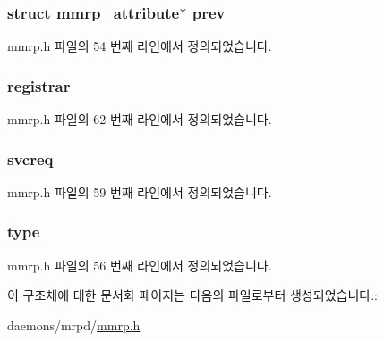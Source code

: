 \subsubsection[{\texorpdfstring{prev}{prev}}]{\setlength{\rightskip}{0pt plus 5cm}struct {\bf mmrp\+\_\+attribute}$\ast$ prev}\hypertarget{structmmrp__attribute_a7fbec6f5452666d1234cf6138dc9f0ba}{}\label{structmmrp__attribute_a7fbec6f5452666d1234cf6138dc9f0ba}


mmrp.\+h 파일의 54 번째 라인에서 정의되었습니다.

\subsubsection[{\texorpdfstring{registrar}{registrar}}]{ registrar}\hypertarget{structmmrp__attribute_a9e893db6ef01e9cda330159f5d3ee764}{}\label{structmmrp__attribute_a9e893db6ef01e9cda330159f5d3ee764}


mmrp.\+h 파일의 62 번째 라인에서 정의되었습니다.

\subsubsection[{\texorpdfstring{svcreq}{svcreq}}]{ svcreq}\hypertarget{structmmrp__attribute_a4cbde8a8ff7947691adb3e1de9ac37e5}{}\label{structmmrp__attribute_a4cbde8a8ff7947691adb3e1de9ac37e5}


mmrp.\+h 파일의 59 번째 라인에서 정의되었습니다.

\subsubsection[{\texorpdfstring{type}{type}}]{ type}\hypertarget{structmmrp__attribute_ad44b615021ed3ccb734fcaf583ef4a03}{}\label{structmmrp__attribute_ad44b615021ed3ccb734fcaf583ef4a03}


mmrp.\+h 파일의 56 번째 라인에서 정의되었습니다.



이 구조체에 대한 문서화 페이지는 다음의 파일로부터 생성되었습니다.\+:\begin{DoxyCompactItemize}
\item 
daemons/mrpd/\hyperlink{mmrp_8h}{mmrp.\+h}\end{DoxyCompactItemize}
